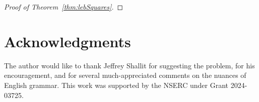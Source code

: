 \documentclass{amsart}
\theoremstyle{plain}
\begin{document}
\begin{proof}[Proof of Theorem~\ref{thm:lebSquares}]
\end{proof}


\section*{Acknowledgments}

The author would like to thank Jeffrey Shallit for suggesting the problem, for his encouragement, 
and for several much-appreciated comments on the nuances of English grammar.
This work was supported by the NSERC under Grant 2024-03725.





\end{document}
